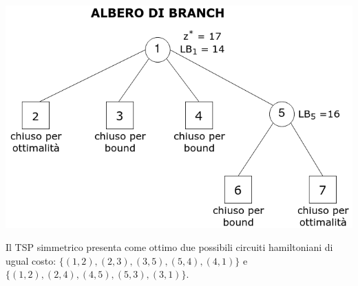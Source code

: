 \documentclass[
    article,            %
    12pt,                %
    oneside,            %
    a4paper,            %
    english,            %
    italian,                %
    sumario=tradicional,
]{abntex2}
\begin{document}
    \begin{center}
        \includegraphics[scale=0.4]{files/alberoBranch3}
    \end{center}
    Il TSP simmetrico presenta come ottimo due possibili circuiti hamiltoniani di ugual costo: $\{(1,2),(2,3),(3,5),(5,4),(4,1)\}$ e $\{(1,2),(2,4),(4,5),(5,3),(3,1)\}$.
\end{document}
